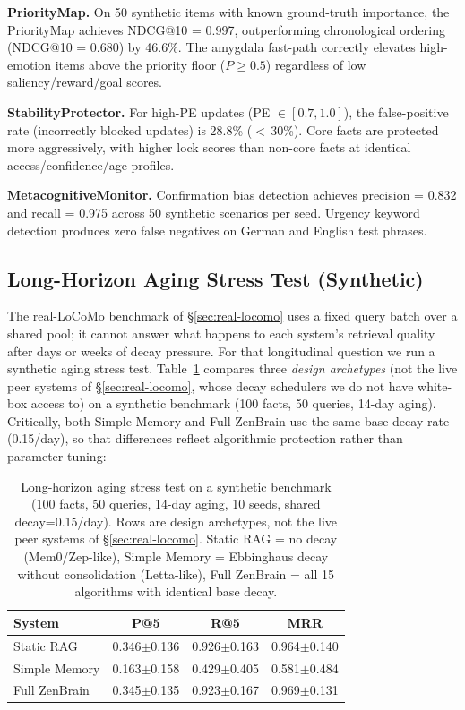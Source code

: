 \documentclass{article}
\begin{document}
\textbf{PriorityMap.}
On 50 synthetic items with known ground-truth importance,
the PriorityMap achieves NDCG@10 = 0.997, outperforming chronological
ordering (NDCG@10 = 0.680) by 46.6\%.
The amygdala fast-path correctly elevates high-emotion items
above the priority floor ($P \geq 0.5$) regardless of low saliency/reward/goal scores.

\textbf{StabilityProtector.}
For high-PE updates (PE $\in [0.7, 1.0]$), the false-positive rate
(incorrectly blocked updates) is 28.8\% ($<$\,30\%).
Core facts are protected more aggressively, with higher lock scores
than non-core facts at identical access/confidence/age profiles.

\textbf{MetacognitiveMonitor.}
Confirmation bias detection achieves precision = 0.832 and recall = 0.975
across 50 synthetic scenarios per seed.
Urgency keyword detection produces zero false negatives on German and English
test phrases.

\subsection{Long-Horizon Aging Stress Test (Synthetic)}
\label{app:long-horizon}

The real-LoCoMo benchmark of \S\ref{sec:real-locomo} uses a
fixed query batch over a shared pool; it cannot answer what happens
to each system's retrieval quality after days or weeks of decay
pressure.
For that longitudinal question we run a synthetic aging stress test.
Table~\ref{tab:competitive} compares three \emph{design archetypes}
(not the live peer systems of \S\ref{sec:real-locomo}, whose decay
schedulers we do not have white-box access to) on a synthetic
benchmark (100 facts, 50 queries, 14-day aging).
Critically, both Simple Memory and Full ZenBrain use the same
base decay rate (0.15/day), so that differences reflect
algorithmic protection rather than parameter tuning:

\begin{table}[h]
    \caption{Long-horizon aging stress test on a synthetic benchmark
    (100 facts, 50 queries, 14-day aging, 10 seeds, shared decay=0.15/day).
    Rows are design archetypes, not the live peer systems of
    \S\ref{sec:real-locomo}. Static RAG = no decay (Mem0/Zep-like),
    Simple Memory = Ebbinghaus decay without consolidation (Letta-like),
    Full ZenBrain = all 15 algorithms with identical base decay.}
    \label{tab:competitive}
    \centering
    \begin{tabular}{lccc}
        \toprule
        System & P@5 & R@5 & MRR \\
        \midrule
        Static RAG & 0.346{\scriptsize$\pm$0.136} & 0.926{\scriptsize$\pm$0.163} & 0.964{\scriptsize$\pm$0.140} \\
        Simple Memory & 0.163{\scriptsize$\pm$0.158} & 0.429{\scriptsize$\pm$0.405} & 0.581{\scriptsize$\pm$0.484} \\
        Full ZenBrain & 0.345{\scriptsize$\pm$0.135} & 0.923{\scriptsize$\pm$0.167} & 0.969{\scriptsize$\pm$0.131} \\
        \bottomrule
    \end{tabular}
\end{table}
\end{document}
